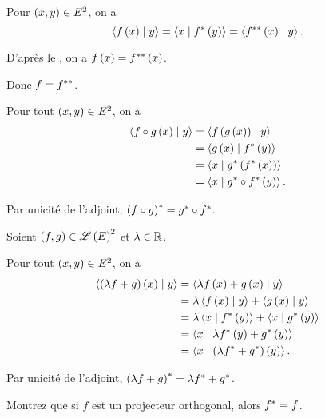 \begin{dem}[2]
Pour \(\left(x,y\right)\in E^2\), on a \[\ps{f\paren{x}}{y}=\ps{x}{f\adj\paren{y}}=\ps{f\adjadj\paren{x}}{y}.\]

D'après le , on a \(f\left(x\right)=f^{**}\left(x\right)\).

Donc \(f=f^{**}\).
\end{dem}

\begin{dem}[3]
Pour tout \(\left(x,y\right)\in E^2\), on a \[\begin{aligned}
\ps{f\rond g\paren{x}}{y}&=\ps{f\paren{g\paren{x}}}{y} \\
&=\ps{g\paren{x}}{f\adj\paren{y}} \\
&=\ps{x}{g\adj\paren{f\adj\paren{x}}} \\
&=\ps{x}{g\adj\rond f\adj\paren{y}}.
\end{aligned}\]

Par unicité de l'adjoint, \(\left(f\circ g\right)^*=g^*\circ f^*\).
\end{dem}

\begin{dem}[1]
Soient \(\left(f,g\right)\in\mathscr{L}\left(E\right)^2\) et \(\lambda\in\mathbb{R}\).

Pour tout \(\left(x,y\right)\in E^2\), on a \[\begin{aligned}
\ps{\paren{\lambda f+g}\paren{x}}{y}&=\ps{\lambda f\paren{x}+g\paren{x}}{y} \\
&=\lambda\ps{f\paren{x}}{y}+\ps{g\paren{x}}{y} \\
&=\lambda\ps{x}{f\adj\paren{y}}+\ps{x}{g\adj\paren{y}} \\
&=\ps{x}{\lambda f\adj\paren{y}+g\adj\paren{y}} \\
&=\ps{x}{\paren{\lambda f\adj+g\adj}\paren{y}}.
\end{aligned}\]

Par unicité de l'adjoint, \(\left(\lambda f+g\right)^*=\lambda f^*+g^*\).
\end{dem}

\begin{exo}
Montrez que si \(f\) est un projecteur orthogonal, alors \(f^*=f\).
\end{exo}

